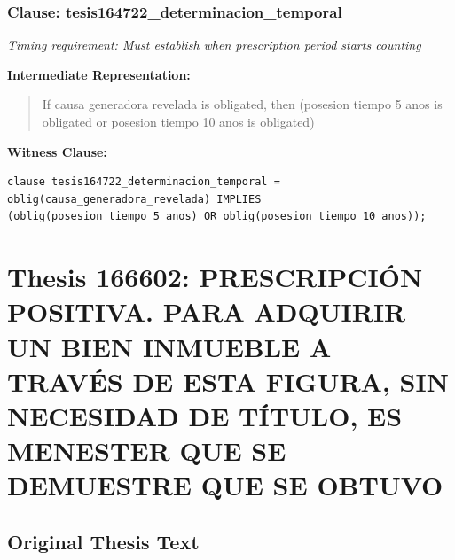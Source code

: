 \documentclass[11pt,a4paper]{article}
\begin{document}
\subsubsection{Clause: tesis164722\_determinacion\_temporal}

\textit{Timing requirement: Must establish when prescription period starts counting}

\textbf{Intermediate Representation:}

\begin{quote}
If causa generadora revelada is obligated, then (posesion tiempo 5 anos is obligated or posesion tiempo 10 anos is obligated)
\end{quote}

\textbf{Witness Clause:}

\begin{lstlisting}[style=witnessstyle, language=Witness]
clause tesis164722_determinacion_temporal = oblig(causa_generadora_revelada) IMPLIES (oblig(posesion_tiempo_5_anos) OR oblig(posesion_tiempo_10_anos));
\end{lstlisting}

\newpage

\section{Thesis 166602: PRESCRIPCIÓN POSITIVA. PARA ADQUIRIR UN BIEN INMUEBLE A TRAVÉS DE ESTA FIGURA, SIN NECESIDAD DE TÍTULO, ES MENESTER QUE SE DEMUESTRE QUE SE OBTUVO}
\label{thesis:166602}

\subsection{Original Thesis Text}
\end{document}
